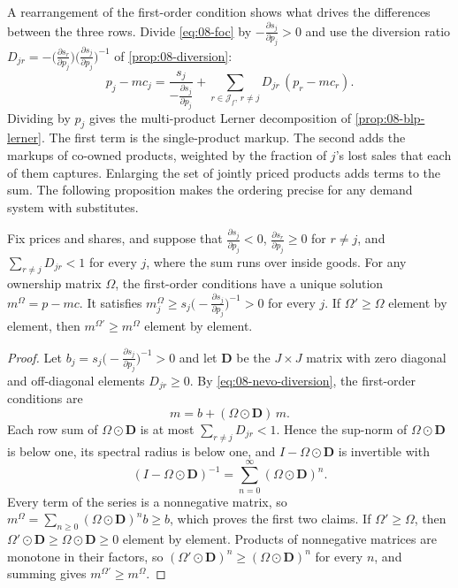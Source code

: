 A rearrangement of the first-order condition shows what drives the differences between the three rows. Divide
\eqref{eq:08-foc} by $-\frac{\partial s_j}{\partial p_j} > 0$ and use the diversion ratio
$D_{jr} = -\big(\frac{\partial s_r}{\partial p_j}\big)\big(\frac{\partial s_j}{\partial p_j}\big)^{-1}$ of \cref{prop:08-diversion}:
\begin{equation}\label{eq:08-nevo-diversion}
p_j - mc_j = \frac{s_j}{-\frac{\partial s_j}{\partial p_j}} + \sum_{r \in \mathcal{J}_f,\, r \neq j}
D_{jr}\,(p_r - mc_r).
\end{equation}
Dividing by $p_j$ gives the multi-product Lerner decomposition of \cref{prop:08-blp-lerner}. The first term is the
single-product markup. The second adds the markups of co-owned products, weighted by the
fraction of $j$'s lost sales that each of them captures. Enlarging the set of jointly priced products adds
terms to the sum. The following proposition makes the ordering precise for any demand system with substitutes.

\begin{proposition}\label{prop:08-nevo-ownership}
Fix prices and shares, and suppose that $\frac{\partial s_j}{\partial p_j} < 0$,
$\frac{\partial s_r}{\partial p_j} \geq 0$ for $r \neq j$, and $\sum_{r \neq j} D_{jr} < 1$ for every $j$,
where the sum runs over inside goods. For any ownership matrix $\Omega$, the first-order conditions have a
unique solution $m^{\Omega} = p - mc$. It satisfies $m^{\Omega}_j \geq s_j\big(-\frac{\partial s_j}{\partial
p_j}\big)^{-1} > 0$ for every $j$. If $\Omega' \geq \Omega$ element by element, then $m^{\Omega'} \geq m^{\Omega}$
element by element.
\end{proposition}

\begin{proof}
Let $b_j = s_j\big(-\frac{\partial s_j}{\partial p_j}\big)^{-1} > 0$ and let $\mathbf{D}$ be the $J\times J$ matrix with
zero diagonal and off-diagonal elements $D_{jr} \geq 0$. By \cref{eq:08-nevo-diversion}, the first-order
conditions are
\[
m = b + (\Omega \odot \mathbf{D})\, m .
\]
Each row sum of $\Omega \odot \mathbf{D}$ is at most $\sum_{r\neq j} D_{jr} < 1$. Hence the sup-norm of
$\Omega\odot\mathbf{D}$ is below one, its spectral radius is below one, and $I - \Omega\odot\mathbf{D}$ is
invertible with
\[
(I - \Omega\odot\mathbf{D})^{-1} = \sum_{n=0}^{\infty} (\Omega\odot\mathbf{D})^n .
\]
Every term of the series is a nonnegative matrix, so $m^{\Omega} = \sum_{n\geq 0} (\Omega\odot\mathbf{D})^n b
\geq b$, which proves the first two claims. If $\Omega' \geq \Omega$, then $\Omega'\odot\mathbf{D} \geq
\Omega\odot\mathbf{D} \geq 0$ element by element. Products of nonnegative matrices are monotone in their
factors, so $(\Omega'\odot\mathbf{D})^n \geq (\Omega\odot\mathbf{D})^n$ for every $n$, and summing gives
$m^{\Omega'} \geq m^{\Omega}$.
\end{proof}

